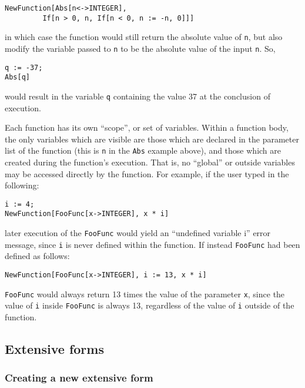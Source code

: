 \begin{verbatim}
NewFunction[Abs[n<->INTEGER],
		 If[n > 0, n, If[n < 0, n := -n, 0]]]
\end{verbatim}

\noindent in which case the function would still return the absolute value
of \verb+n+, but also modify the variable passed to \verb+n+ to be the
absolute value of the input \verb+n+.  So,

\begin{verbatim}
q := -37;
Abs[q]
\end{verbatim}

\noindent would result in the variable \verb+q+ containing the value 37
at the conclusion of execution.

Each function has its own ``scope'', or set of variables.  Within a function
body, the only variables which are visible are those which are declared
in the parameter list of the function (this is \verb+n+ in the \verb+Abs+
example above), and those which are created during the function's execution.
That is, no ``global'' or outside variables may be accessed directly by the
function.  For example, if the user typed in the following:

\begin{verbatim}
i := 4;
NewFunction[FooFunc[x->INTEGER], x * i]
\end{verbatim}

\noindent later execution of the \verb+FooFunc+ would yield an ``undefined
variable i'' error message, since \verb+i+ is never defined within the
function.  If instead \verb+FooFunc+ had been defined as follows:

\begin{verbatim}
NewFunction[FooFunc[x->INTEGER], i := 13, x * i]
\end{verbatim}

\noindent \verb+FooFunc+ would always return 13 times the value of the
parameter \verb+x+, since the value of \verb+i+ inside \verb+FooFunc+ is
always 13, regardless of the value of \verb+i+ outside of the function.


\subsection{Extensive forms}

\subsubsection{Creating a new extensive form}

